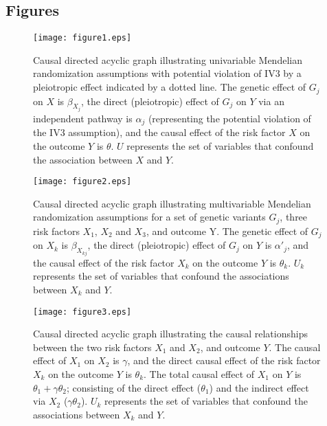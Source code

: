 \documentclass[a4paper,12pt]{article}
\begin{document}
\pagebreak
\subsection*{Figures}
\begin{figure}[htb]
\centering
\texttt{[image: figure1.eps]}
\caption{Causal directed acyclic graph illustrating univariable Mendelian randomization assumptions with potential violation of IV3 by a pleiotropic effect indicated by a dotted line. The genetic effect of $G_{j}$ on $X$ is $\beta_{X_{j}}$, the direct (pleiotropic) effect of $G_{j}$ on $Y$ via an independent pathway is $\alpha_{j}$ (representing the potential violation of the IV3 assumption), and the causal effect of the risk factor $X$ on the outcome $Y$ is $\theta$. $U$ represents the set of variables that confound the association between $X$ and $Y$.} \label{dag1}
\end{figure}

\begin{figure}[htb]
\centering
\texttt{[image: figure2.eps]}
\caption{Causal directed acyclic graph illustrating multivariable Mendelian randomization assumptions for a set of genetic variants $G_{j}$, three risk factors $X_{1}$, $X_{2}$ and $X_{3}$, and outcome Y.  The genetic effect of $G_{j}$ on $X_{k}$ is $\beta_{X_{kj}}$, the direct (pleiotropic) effect of $G_{j}$ on $Y$ is $\alpha'_{j}$, and the causal effect of the risk factor $X_{k}$ on the outcome $Y$ is $\theta_{k}$. $U_k$ represents the set of variables that confound the associations between $X_k$ and $Y$.} \label{dag2}
\end{figure}

\begin{figure}[htb]
\centering
\texttt{[image: figure3.eps]}
\caption{Causal directed acyclic graph illustrating the causal relationships between the two risk factors $X_{1}$ and $X_{2}$, and outcome $Y$. The causal effect of $X_{1}$ on $X_{2}$ is $\gamma$, and the direct causal effect of the risk factor $X_k$ on the outcome $Y$ is $\theta_{k}$. The total causal effect of $X_1$ on $Y$ is $\theta_1 + \gamma\theta_2$; consisting of the direct effect ($\theta_1$) and the indirect effect via $X_2$ ($\gamma\theta_2$). $U_k$ represents the set of variables that confound the associations between $X_k$ and $Y$.} \label{dag3}
\end{figure}

\clearpage
\renewcommand{\thesection}{A\arabic{section}}
\renewcommand{\thesubsection}{A.\arabic{subsection}}
\renewcommand{\thetable}{A\arabic{table}}
\renewcommand{\thefigure}{A\arabic{figure}}
\setcounter{table}{0}
\setcounter{figure}{0}
\setcounter{section}{0}
\setcounter{subsection}{0}
\setcounter{equation}{0}
\end{document}
